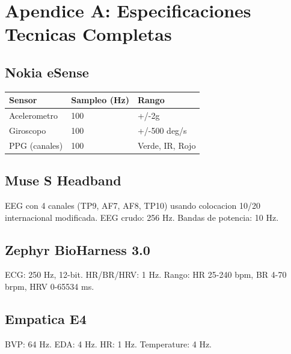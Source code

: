 \section*{Apendice A: Especificaciones Tecnicas Completas}

\subsection*{Nokia eSense}

\begin{table}[H]
\centering
\begin{tabular}{|l|l|l|}
\hline
\textbf{Sensor} & \textbf{Sampleo (Hz)} & \textbf{Rango} \\
\hline
Acelerometro & 100 & +/-2g \\
Giroscopo & 100 & +/-500 deg/s \\
PPG (canales) & 100 & Verde, IR, Rojo \\
\hline
\end{tabular}
\end{table}

\subsection*{Muse S Headband}

EEG con 4 canales (TP9, AF7, AF8, TP10) usando colocacion 10/20 internacional modificada.
EEG crudo: 256 Hz. Bandas de potencia: 10 Hz.

\subsection*{Zephyr BioHarness 3.0}

ECG: 250 Hz, 12-bit. HR/BR/HRV: 1 Hz.
Rango: HR 25-240 bpm, BR 4-70 brpm, HRV 0-65534 ms.

\subsection*{Empatica E4}

BVP: 64 Hz. EDA: 4 Hz. HR: 1 Hz. Temperature: 4 Hz.
